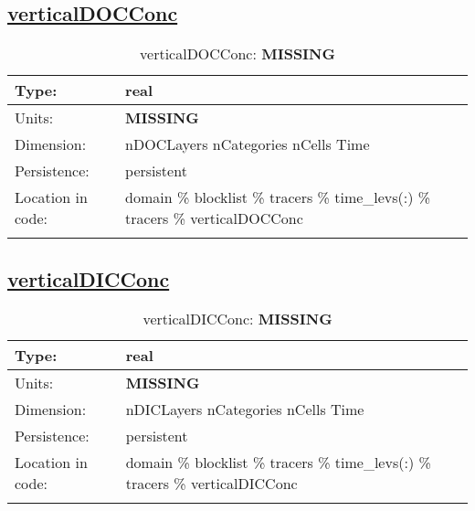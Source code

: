 \subsection[verticalDOCConc]{\hyperref[sec:var_tab_tracers]{verticalDOCConc}}
\label{subsec:var_sec_tracers_verticalDOCConc}
\begin{center}
\begin{longtable}{| p{2.0in} | p{4.0in} |}
        \hline 
        Type: & real \\
        \hline 
        Units: & {\bf \color{red} MISSING} \\
        \hline 
        Dimension: & nDOCLayers nCategories nCells Time \\
        \hline 
        Persistence: & persistent \\
        \hline 
         Location in code: & domain \% blocklist \% tracers \% time\_levs(:) \% tracers \% verticalDOCConc \\
         \hline 
    \caption{verticalDOCConc: {\bf \color{red} MISSING}}
\end{longtable}
\end{center}
\subsection[verticalDICConc]{\hyperref[sec:var_tab_tracers]{verticalDICConc}}
\label{subsec:var_sec_tracers_verticalDICConc}
\begin{center}
\begin{longtable}{| p{2.0in} | p{4.0in} |}
        \hline 
        Type: & real \\
        \hline 
        Units: & {\bf \color{red} MISSING} \\
        \hline 
        Dimension: & nDICLayers nCategories nCells Time \\
        \hline 
        Persistence: & persistent \\
        \hline 
         Location in code: & domain \% blocklist \% tracers \% time\_levs(:) \% tracers \% verticalDICConc \\
         \hline 
    \caption{verticalDICConc: {\bf \color{red} MISSING}}
\end{longtable}
\end{center}

